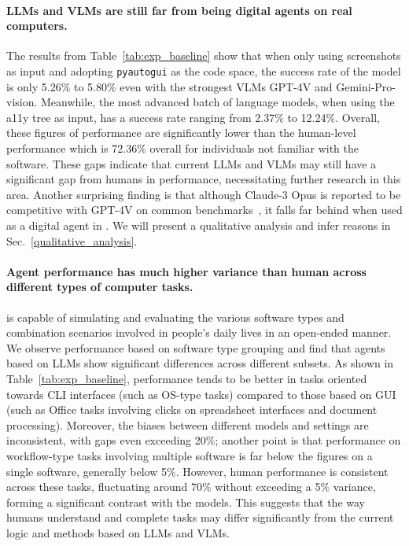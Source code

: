 \paragraph{LLMs and VLMs are still far from being digital agents on real computers.}
The results from Table~\ref{tab:exp_baseline} show that when only using screenshots as input and adopting \texttt{pyautogui} as the code space, the success rate of the model is only 5.26\% to 5.80\% even with the strongest VLMs GPT-4V and Gemini-Pro-vision.
Meanwhile, the most advanced batch of language models, when using the a11y tree as input, has a success rate ranging from 2.37\% to 12.24\%.
Overall, these figures of performance are significantly lower than the human-level performance which is 72.36\% overall for individuals not familiar with the software.
These gaps indicate that current LLMs and VLMs may still have a significant gap from humans in performance, necessitating further research in this area.
Another surprising finding is that although Claude-3 Opus is reported to be competitive with GPT-4V on common benchmarks~\citep{Anthropic2023Claude}, it falls far behind when used as a digital agent in \ours. 
We will present a qualitative analysis and infer reasons in Sec.~\ref{qualitative_analysis}.

\paragraph{Agent performance has much higher variance than human across different types of computer tasks.}
\ours is capable of simulating and evaluating the various software types and combination scenarios involved in people's daily lives in an open-ended manner. 
We observe performance based on software type grouping and find that agents based on LLMs show significant differences across different subsets. 
As shown in Table~\ref{tab:exp_baseline}, performance tends to be better in tasks oriented towards CLI interfaces (such as OS-type tasks) compared to those based on GUI (such as Office tasks involving clicks on spreadsheet interfaces and document processing). 
Moreover, the biases between different models and settings are inconsistent, with gaps even exceeding 20\%; another point is that performance on workflow-type tasks involving multiple software is far below the figures on a single software, generally below 5\%. 
However, human performance is consistent across these tasks, fluctuating around 70\% without exceeding a 5\% variance, forming a significant contrast with the models. 
This suggests that the way humans understand and complete tasks may differ significantly from the current logic and methods based on LLMs and VLMs.


